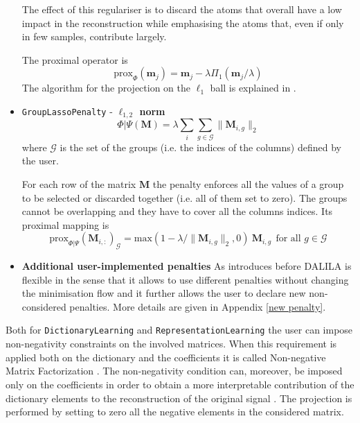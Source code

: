\begin{itemize}
The effect of this regulariser is to discard the atoms that overall have a low impact in the reconstruction while emphasising the atoms that, even if only in few samples, contribute largely.

The proximal operator is
\begin{equation}\label{proxlinf}
    \text{prox}_{\Phi}(\mathbf{m}_j) = \mathbf{m}_j - \lambda \Pi_1(\mathbf{m}_j/\lambda)
\end{equation}
The algorithm for the projection on the $\ell_1$ ball is explained in \cite{duchi2008efficient}.\\
%
%
%
\item \texttt{GroupLassoPenalty} - \textbf{$\ell_{1,2}$ norm}
\begin{equation}\label{group lasso penalty}
\Phi|\Psi(\mathbf{M}) = \lambda \sum_i \sum_{g \in \mathcal{G}} \|\mathbf{M}_{i,g}\|_2
\end{equation}
where $\mathcal{G}$ is the set of the groups (i.e. the indices of the columns) defined by the user.

For each row of the matrix $\mathbf{M}$ the penalty enforces all the values of a group to be selected or discarded together (i.e. all of them set to zero). The groups cannot be overlapping and they have to cover all the columns indices.
Its proximal mapping is
\begin{equation}\label{proxgrouplasso}
    \text{prox}_{\Phi|\Psi}(\mathbf{M}_{i,:})_\mathcal{G} = \text{max}(1 - \lambda/ \| \mathbf{M}_{i,g}\|_2, 0)\ \mathbf{M}_{i,g} \ \ \text{for all } g \in \mathcal{G}
\end{equation}

\item \textbf{Additional user-implemented penalties}
As introduces before DALILA is flexible in the sense that it allows to use different penalties without changing the minimisation
 flow and it further allows the user to declare new non-considered penalties. More details are given in Appendix \ref{new penalty}. 
\end{itemize}

\vspace{0.5cm}
Both for \texttt{DictionaryLearning} and \texttt{RepresentationLearning} the user can impose non-negativity constraints on the involved matrices.
When this requirement is applied both on the dictionary and the coefficients it is called Non-negative Matrix Factorization %
\cite{lee1999learning}.
The non-negativity condition can, moreover, be imposed only on the coefficients in order to obtain a more
interpretable contribution of the dictionary elements to the reconstruction of the original signal \cite{salzo2014alternating}. The projection is performed
by setting to zero all the negative elements in the considered matrix.
%
%

